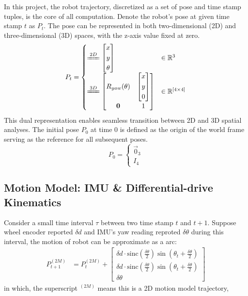 \documentclass[conference]{IEEEtran}
\begin{document}
In this project, the robot trajectory, discretized as a set of pose and time stamp tuples, is the core of all computation.
Denote the robot's pose at given time stamp \(t\) as \(P_t\).
The pose can be represented in both two-dimensional (2D) and three-dimensional (3D) spaces, 
with the z-axis value fixed at zero. 
$$
P_{t} = \begin{cases}
    \xlongequal{2D} \left[ \begin{gathered}x\\ y\\ \theta \end{gathered} \right] & \in \mathbb{R}^{3} \\ 
    \xlongequal{3D} \left[ \begin{matrix}R_{yaw}(\theta )&\left[ \begin{gathered}x\\ y\\0\end{gathered} \right]  \\ \mathbf{0}&1\end{matrix} \right] & \in \mathbb{R}^{[4\times 4]}
\end{cases} 
$$
This dual representation enables seamless transition between 2D and 3D spatial analyses.
The initial pose $P_0$ at time 0 is defined as the origin of the world frame
serving as the reference for all subsequent poses.
$$P_{0}=\begin{cases}\vec{0}_{3}\\ I_{4}\end{cases} $$


\subsection{Motion Model: IMU \& Differential-drive Kinematics}
Consider a small time interval $\tau$ between two time stamp $t$ and $t+1$.
Suppose wheel encoder reported $\delta d$
and IMU's yaw reading reproted $\delta \theta$ during this interval,
the motion of robot can be approximate as a arc:
$$
\begin{aligned}
    P_{t+1}^{(2M)}
    &=P_{t}^{(2M)} +\left[ \begin{gathered}\delta d\cdot \mathrm{sinc} \left( \frac{\delta \theta }{2} \right)  \sin \left( \theta_{t} +\frac{\delta \theta }{2} \right)  \\ \delta d\cdot \mathrm{sinc} \left( \frac{\delta \theta }{2} \right)  \sin \left( \theta_{t} +\frac{\delta \theta }{2} \right)  \\ \delta \theta \end{gathered} \right]
\end{aligned} 
$$
in which, the superscript $^{(2M)}$ means this is a 2D motion model trajectory,
\end{document}
